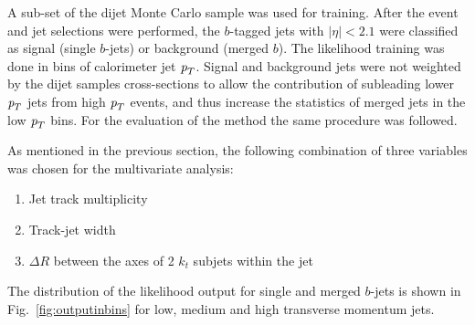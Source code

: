 A sub-set of the dijet Monte Carlo sample was used for training. After the event and jet selections were performed, the $b$-tagged jets with $|\eta| < 2.1$ were classified as signal (single $b$-jets) or background (merged $b$). %
The likelihood training was done in bins of calorimeter jet ${\emph{p}_{T}}$. %
Signal and background jets were not weighted by the dijet samples cross-sections to allow the contribution of subleading lower ${\emph{p}_{T}}$ jets from high ${\emph{p}_{T}}$ events, and thus increase the statistics of merged jets in the low ${\emph{p}_{T}}$ bins. For the evaluation of the method the same procedure was followed.


As mentioned in the previous section, the following combination of three variables was chosen for the multivariate analysis:
\begin{enumerate}\addtolength{\itemsep}{-0.4\baselineskip}
\item
Jet track multiplicity
\item
Track-jet width
\item
$\Delta R$ between the axes of 2 $k_t$ subjets within the jet
\end{enumerate}
%

The distribution of the likelihood output for single and merged $b$-jets is shown in  Fig.~\ref{fig:outputinbins} for low, medium and high transverse momentum jets.

